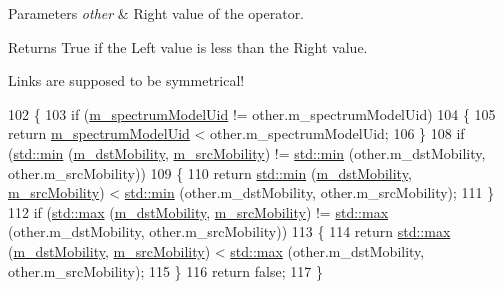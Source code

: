 \begin{DoxyParams}{Parameters}
{\em other} & Right value of the operator. \\
\hline
\end{DoxyParams}
\begin{DoxyReturn}{Returns}
True if the Left value is less than the Right value. 
\end{DoxyReturn}
Links are supposed to be symmetrical! 
\begin{DoxyCode}
102     \{
103       \textcolor{keywordflow}{if} (\hyperlink{structns3_1_1PropagationCache_1_1PropagationPathIdentifier_a9396f0ffb7dda7ec56e2a576153e2d19}{m\_spectrumModelUid} != other.m\_spectrumModelUid)
104         \{
105           \textcolor{keywordflow}{return} \hyperlink{structns3_1_1PropagationCache_1_1PropagationPathIdentifier_a9396f0ffb7dda7ec56e2a576153e2d19}{m\_spectrumModelUid} < other.m\_spectrumModelUid;
106         \}
108       \textcolor{keywordflow}{if} (\hyperlink{80211b_8c_ac6afabdc09a49a433ee19d8a9486056d}{std::min} (\hyperlink{structns3_1_1PropagationCache_1_1PropagationPathIdentifier_ab5da776321dcac22d720c88e49931096}{m\_dstMobility}, \hyperlink{structns3_1_1PropagationCache_1_1PropagationPathIdentifier_a89a398a7cce2c9a9b7bb4bc0ddc45710}{m\_srcMobility}) != 
      \hyperlink{80211b_8c_ac6afabdc09a49a433ee19d8a9486056d}{std::min} (other.m\_dstMobility, other.m\_srcMobility))
109         \{
110           \textcolor{keywordflow}{return} \hyperlink{80211b_8c_ac6afabdc09a49a433ee19d8a9486056d}{std::min} (\hyperlink{structns3_1_1PropagationCache_1_1PropagationPathIdentifier_ab5da776321dcac22d720c88e49931096}{m\_dstMobility}, \hyperlink{structns3_1_1PropagationCache_1_1PropagationPathIdentifier_a89a398a7cce2c9a9b7bb4bc0ddc45710}{m\_srcMobility}) < 
      \hyperlink{80211b_8c_ac6afabdc09a49a433ee19d8a9486056d}{std::min} (other.m\_dstMobility, other.m\_srcMobility);
111         \}
112       \textcolor{keywordflow}{if} (\hyperlink{80211b_8c_affe776513b24d84b39af8ab0930fef7f}{std::max} (\hyperlink{structns3_1_1PropagationCache_1_1PropagationPathIdentifier_ab5da776321dcac22d720c88e49931096}{m\_dstMobility}, \hyperlink{structns3_1_1PropagationCache_1_1PropagationPathIdentifier_a89a398a7cce2c9a9b7bb4bc0ddc45710}{m\_srcMobility}) != 
      \hyperlink{80211b_8c_affe776513b24d84b39af8ab0930fef7f}{std::max} (other.m\_dstMobility, other.m\_srcMobility))
113         \{
114           \textcolor{keywordflow}{return} \hyperlink{80211b_8c_affe776513b24d84b39af8ab0930fef7f}{std::max} (\hyperlink{structns3_1_1PropagationCache_1_1PropagationPathIdentifier_ab5da776321dcac22d720c88e49931096}{m\_dstMobility}, \hyperlink{structns3_1_1PropagationCache_1_1PropagationPathIdentifier_a89a398a7cce2c9a9b7bb4bc0ddc45710}{m\_srcMobility}) < 
      \hyperlink{80211b_8c_affe776513b24d84b39af8ab0930fef7f}{std::max} (other.m\_dstMobility, other.m\_srcMobility);
115         \}
116       \textcolor{keywordflow}{return} \textcolor{keyword}{false};
117     \}
\end{DoxyCode}


